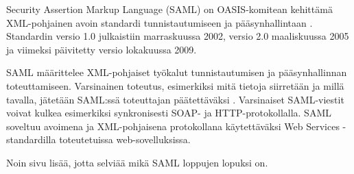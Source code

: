 Security Assertion Markup Language (SAML) on OASIS-komitean kehittämä XML-pohjainen avoin standardi tunnistautumiseen ja pääsynhallintaan \cite{saml_spec}. Standardin versio 1.0 julkaistiin marraskuussa 2002, versio 2.0 maaliskuussa 2005 ja viimeksi päivitetty versio lokakuussa 2009.

SAML määrittelee XML-pohjaiset työkalut tunnistautumisen ja pääsynhallinnan toteuttamiseen. Varsinainen toteutus, esimerkiksi mitä tietoja siirretään ja millä tavalla, jätetään SAML:ssä toteuttajan päätettäväksi \cite{dynamic_saml}. Varsinaiset SAML-viestit voivat kulkea esimerkiksi synkronisesti SOAP- ja HTTP-protokollalla. SAML soveltuu avoimena ja XML-pohjaisena protokollana käytettäväksi Web Services -standardilla toteutetuissa web-sovelluksissa.

Noin sivu lisää, jotta selviää mikä SAML loppujen lopuksi on.